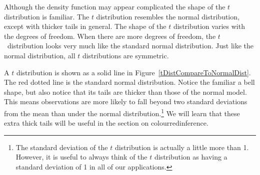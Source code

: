 Although the density function may appear complicated the shape of the $t$ distribution is familiar.
The $t$ distribution resembles the normal distribution, except with thicker tails in general. 
The shape of the $t$ distribution varies with the degrees of freedom.
When there are more degrees of freedom, the $t$~distribution looks very much like the standard normal distribution.
Just like the normal distribution, all $t$ distributions are symmetric.

A $t$ distribution is shown as a solid line in Figure~\ref{tDistCompareToNormalDist}.
The red dotted line is the standard normal distribution. 
Notice the familiar a bell shape, but also notice that its tails are thicker than those of the normal model. 
This means observations are more likely to fall beyond two standard deviations from the mean than under the normal distribution.\footnote{The standard deviation of the $t$ distribution is actually a little more than 1. However, it is useful to always think of the $t$ distribution as having a standard deviation of 1 in all of our applications.} 
We will learn that these extra thick tails will be useful in the section on {colour{red}{inference}}.




